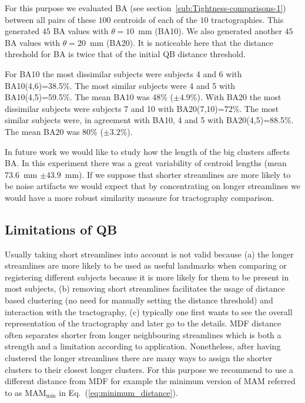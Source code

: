 \documentclass{bioinfo}
\begin{document}
For this purpose we evaluated BA (see
section~\ref{sub:Tightness-comparisons-1}) between all pairs of these
$100$ centroids of each of the $10$ tractographies. This generated $45$
BA values with $\theta=10$~mm (BA10). We also generated another $45$ BA
values with $\theta=20$~mm (BA20). It is noticeable here that the
distance threshold for BA is twice that of the initial QB distance
threshold. 

For BA10 the most dissimilar subjects were subjects 4 and 6 with
BA10(4,6)=38.5\%. The most similar subjects were 4 and 5 with
BA10(4,5)=59.5\%. The mean BA10 was 48\% ($\pm\num{4.9}$\%). With
BA20 the most dissimilar subjects were subjects 7 and 10 with
BA20(7,10)=72\%. The most similar subjects were, in agreement with BA10,
4 and 5 with BA20(4,5)=88.5\%. The mean BA20 was 80\%
($\pm\num{3.2}$\%).

In future work we would like to study how the length of the big clusters
affects BA. In this experiment there was a great variability of centroid
lengths (mean $73.6$~mm $\pm\num{43.9}$~mm). If we suppose that shorter
streamlines are more likely to be noise artifacts we would expect that
by concentrating on longer streamlines we would have a more robust
similarity measure for tractography comparison.

\subsection{Limitations of QB\label{sub:short_tracks}}

Usually taking short streamlines into account is not valid because (a)
the longer streamlines are more likely to be used as useful landmarks
when comparing or registering different subjects because it is more
likely for them to be present in most subjects, (b) removing short
streamlines facilitates the usage of distance based clustering (no need
for manually setting the distance threshold) and interaction with the
tractography, (c) typically one first wants to see the overall
representation of the tractography and later go to the details. MDF
distance often separates shorter from longer neighbouring streamlines
which is both a strength and a limitation according to
application. Nonetheless, after having clustered the longer streamlines
there are many ways to assign the shorter clusters to their closest
longer clusters. For this purpose we recommend to use a different
distance from MDF for example the minimum version of MAM referred to as
$\textrm{MAM}_{\textrm{min}}$ in Eq.~(\ref{eq:minimum_distance}).
\end{document}

